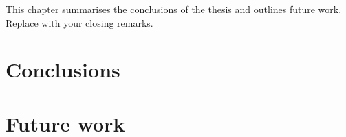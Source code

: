 %

This chapter summarises the conclusions of the thesis and outlines future work. Replace with your closing remarks.

\lipsum[51-54]

\section{Conclusions}\label{sec:conclusions}

\lipsum[55-57]

\section{Future work}\label{sec:future}

\lipsum[58-60]

